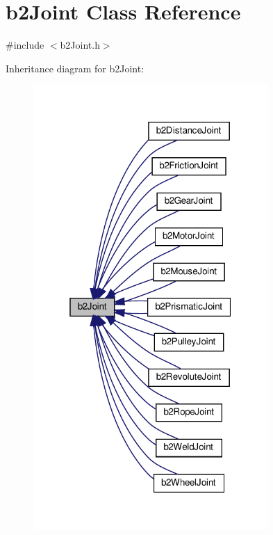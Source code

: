 \hypertarget{classb2Joint}{}\section{b2\+Joint Class Reference}
\label{classb2Joint}


{\ttfamily \#include $<$b2\+Joint.\+h$>$}



Inheritance diagram for b2\+Joint\+:
\nopagebreak
\begin{figure}[H]
\begin{center}
\leavevmode
\includegraphics[width=253pt]{classb2Joint__inherit__graph}
\end{center}
\end{figure}



